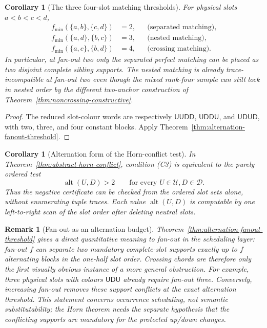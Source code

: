 \documentclass[11pt]{article}
\newtheorem{corollary}[definition]{Corollary}
\newtheorem{remark}[definition]{Remark}
\begin{document}
\begin{corollary}[The three four-slot matching thresholds]
\label{cor:matching-fanout-thresholds}
For physical slots $a<b<c<d$,
\[
\begin{aligned}
 f_{\min}(\{a,b\},\{c,d\})&=2,
 &&\text{(separated matching)},\\
 f_{\min}(\{a,d\},\{b,c\})&=3,
 &&\text{(nested matching)},\\
 f_{\min}(\{a,c\},\{b,d\})&=4,
 &&\text{(crossing matching)}.
\end{aligned}
\]
In particular, at fan-out two only the separated perfect matching can be
placed as two disjoint complete sibling supports.  The nested matching is
already trace-incompatible at fan-out two even though the mixed rank-four
sample can still lock in nested order by the different two-anchor construction
of Theorem~\ref{thm:noncrossing-constructive}.
\end{corollary}

\begin{proof}
The reduced slot-colour words are respectively
$\mathsf U\mathsf U\mathsf D\mathsf D$,
$\mathsf U\mathsf D\mathsf D\mathsf U$, and
$\mathsf U\mathsf D\mathsf U\mathsf D$, with two, three, and four constant
blocks.  Apply Theorem~\ref{thm:alternation-fanout-threshold}.
\end{proof}

\begin{corollary}[Alternation form of the Horn-conflict test]
\label{cor:alternation-horn-conflict}
In Theorem~\ref{thm:abstract-horn-conflict}, condition \textup{(C3)} is
equivalent to the purely ordered test
\[
 \boxed{
 \operatorname{alt}(U,D)>2
 \qquad
 \text{for every }U\in\mathcal U,
 D\in\mathcal D.
 }
\]
Thus the negative certificate can be checked from the ordered slot sets alone,
without enumerating tuple traces.  Each value
$\operatorname{alt}(U,D)$ is computable by one left-to-right scan of the slot
order after deleting neutral slots.
\end{corollary}

\begin{remark}[Fan-out as an alternation budget]
Theorem~\ref{thm:alternation-fanout-threshold} gives a direct quantitative
meaning to fan-out in the scheduling layer: fan-out $f$ can separate two
mandatory complete-slot supports exactly up to $f$ alternating blocks in the
one-half slot order.  Crossing chords are therefore only the first visually
obvious instance of a more general obstruction.  For example, three physical
slots with colours $\mathsf U\mathsf D\mathsf U$ already require fan-out three.
Conversely, increasing fan-out removes these support conflicts at the exact
alternation threshold.  This statement concerns occurrence scheduling, not
semantic substitutability; the Horn theorem needs the separate hypothesis that
the conflicting supports are mandatory for the protected up/down changes.
\end{remark}
\end{document}

